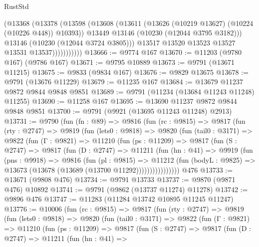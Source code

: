 \begin{lexlean}{RustStd}
\begin{coremodule}
                      (@13368
                        (@13378
                          (@13598
                            (@13608
                              (@13611 (@13626 (@10219 @13627) (@10224 (@10226 @448)) @10393))
                              @13449
                              @13146
                              (@10230 (@12044 @3795 @3182)))
                            @13146
                            (@10230 (@12044 @3724 @3805)))
                          @13517
                          @13520
                          @13523
                          @13527
                          @13531
                          @13537)))))))))))
@13666 := @9774 @167
@13670 := @11203 (@9780 @167) (@9786 @167)
@13671 := @9795 @10889
@13673 := @9791 (@13671 @11215)
@13675 := @9833 (@9834 @167)
@13676 := @9829 @13675
@13678 := @9791 (@13676 @11229)
@13679 := @11235 @167
@13684 := @13679 @11237 @9872 @9844 @9848 @9851
@13689 := @9791 (@11234 (@13684 @11243 @11248) @11255)
@13690 := @11258 @167
@13695 := @13690 @11237 @9872 @9844 @9848 @9851
@13700 := @9791 (@9921 (@13695 @11243 @11248) @2913)
@13731 := @9790
    (fun (fn : @89) =>
    @9816
      (fun (rc : @9815) =>
      @9817
        (fun (rty : @2747) =>
        @9819
          (fun (lets0 : @9818) =>
          @9820
            (fun (tail0 : @3171) =>
            @9822
              (fun (Γ : @9821) =>
              @11210
                (fun (ps : @11209) =>
                @9817
                  (fun (S : @2747) =>
                  @9817
                    (fun (D : @2747) =>
                    @11211
                      (fun (hn : @41) =>
                      @9919
                        (fun (pns : @9918) =>
                        @9816
                          (fun (pl : @9815) =>
                          @11212
                            (fun (bodyL : @9825) =>
                            @13673 (@13678 (@13689 (@13700 @11292))))))))))))))))
    @476
@13733 := @13671 (@9808 @476)
@13734 := @9791 @13733
@13737 := @9870 (@9871 @476) @10892
@13741 := @9791 (@9862 (@13737 @11274) @11278)
@13742 := @9896 @476
@13747 := @11283 (@11284 @13742 @10895 @11245 @11247)
@13776 := @10006
    (fun (rc : @9815) =>
    @9817
      (fun (rty : @2747) =>
      @9819
        (fun (lets0 : @9818) =>
        @9820
          (fun (tail0 : @3171) =>
          @9822
            (fun (Γ : @9821) =>
            @11210
              (fun (ps : @11209) =>
              @9817
                (fun (S : @2747) =>
                @9817
                  (fun (D : @2747) =>
                  @11211
                    (fun (hn : @41) =>

\end{coremodule}
\end{lexlean}
